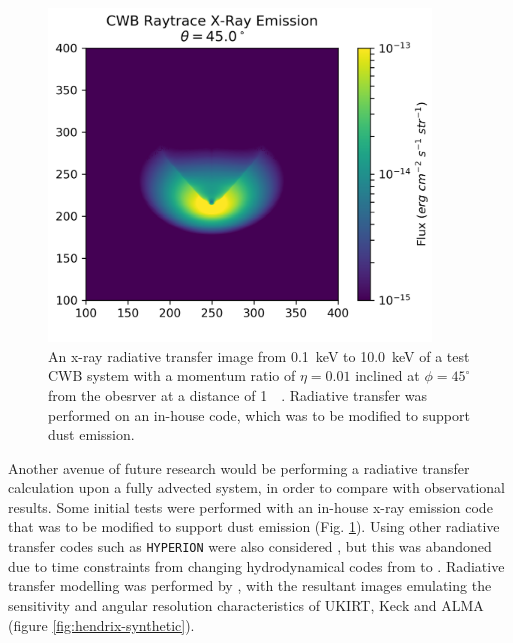 
\begin{figure}[ht]
  \centering
  \includegraphics[width=4in]{assets/ray/cwb-raytrace-045.0.png}
  \caption[An x-ray radiative transfer example]{An x-ray radiative transfer image from \SI{0.1}{\kilo\electronvolt} to \SI{10.0}{\kilo\electronvolt} of a test CWB system with a momentum ratio of $\eta = 0.01$ inclined at $\phi = 45^\circ$ from the obesrver at a distance of \SI{1}{\kilo\parsec}. Radiative transfer was performed on an in-house code, which was to be modified to support dust emission.}
  \label{fig:inhousert}
\end{figure}

Another avenue of future research would be performing a radiative transfer calculation upon a fully advected system, in order to compare with observational results.
Some initial tests were performed with an in-house x-ray emission code that was to be modified to support dust emission (Fig. \ref{fig:inhousert}).
Using other radiative transfer codes such as \texttt{HYPERION} were also considered \parencite{robitailleHYPERIONOpensourceParallelized2011}, but this was abandoned due to time constraints from changing hydrodynamical codes from \mg{} to \athena{}.
Radiative transfer modelling was performed by \textcite{hendrix_pinwheels_2016}, with the resultant images emulating the sensitivity and angular resolution characteristics of UKIRT, Keck and ALMA (figure \ref{fig:hendrix-synthetic}).

